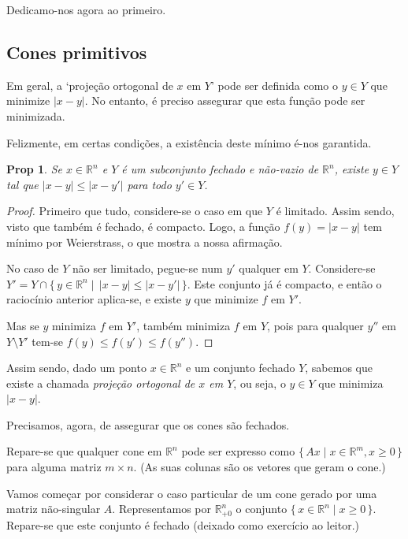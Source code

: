 \documentclass{article}
\newcommand{\R}{\mathbb{R}}
\newtheorem{prop}{Prop}
\theoremstyle{definition}
\begin{document}
	Dedicamo-nos agora ao primeiro.
	
	\subsection{Cones primitivos}
	
	Em geral, a `projeção ortogonal de $x$ em $Y$' pode ser definida como o $y \in Y$ que minimize $\lvert x - y \rvert$. No entanto, é preciso assegurar que esta função pode ser minimizada.
	
	Felizmente, em certas condições, a existência deste mínimo é-nos garantida.
	
	\begin{prop}
	Se $x \in \R^n$ e $Y$ é um subconjunto fechado e não-vazio de $\R^n$, existe $y \in Y$ tal que $\lvert x - y \rvert \leq \lvert x - y' \rvert$ para todo $y' \in Y$.
	\end{prop}
	
	\begin{proof}
	Primeiro que tudo, considere-se o caso em que $Y$ é limitado. Assim sendo, visto que também é fechado, é compacto. Logo, a função $f(y) = \lvert x - y \rvert$ tem mínimo por Weierstrass, o que mostra a nossa afirmação.
	
	No caso de $Y$ não ser limitado, pegue-se num $y'$ qualquer em $Y$. Considere-se $Y' = Y \cap \{\, y \in \R^n \mid \, \lvert x - y \rvert \leq \lvert x - y' \rvert \,\}$. Este conjunto já é compacto, e então o raciocínio anterior aplica-se, e existe $y$ que minimize $f$ em $Y'$.
	
	Mas se $y$ minimiza $f$ em $Y'$, também minimiza $f$ em $Y$, pois para qualquer $y''$ em $Y \setminus Y'$ tem-se $f(y) \leq f(y') \leq f(y'')$.
	\end{proof}
	
	Assim sendo, dado um ponto $x \in \R^n$ e um conjunto fechado $Y$, sabemos que existe a chamada \emph{projeção ortogonal de $x$ em $Y$}, ou seja, o $y \in Y$ que minimiza $\lvert x - y \rvert$.
	
	Precisamos, agora, de assegurar que os cones são fechados.
	
	Repare-se que qualquer cone em $\R^n$ pode ser expresso como $\{\,Ax \mid x \in \R^m, x \geq 0\,\}$ para alguma matriz $m \times n$. (As suas colunas são os vetores que geram o cone.)
	
	Vamos começar por considerar o caso particular de um cone gerado por uma matriz não-singular $A$. Representamos por $\R^n_{+0}$ o conjunto $\{\,x \in \R^n \mid x \geq 0\,\}$. Repare-se que este conjunto é fechado (deixado como exercício ao leitor.)
	
\end{document}
